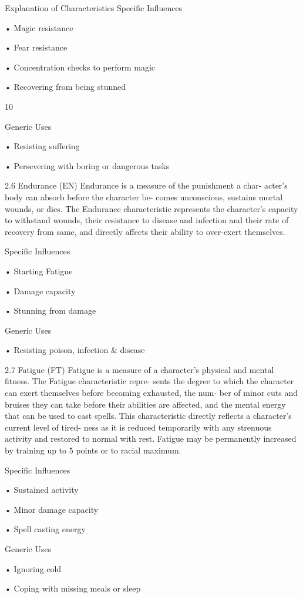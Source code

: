 \begin{Chapter}{Explanation of Characteristics}
Specific Influences  

• Magic resistance  

• Fear resistance  

• Concentration checks to perform magic  

• Recovering from being stunned 

10 

Generic Uses  

• Resisting suffering  

• Persevering with boring or dangerous tasks 

2.6 Endurance (EN) 
Endurance  is  a  measure  of  the  punishment  a char-
acter’s  body  can  absorb  before  the  character  be-
comes  unconscious,  sustains  mortal  wounds,  or 
dies.  The  Endurance  characteristic  represents  the 
character’s  capacity  to  withstand  wounds,  their 
resistance to disease and infection and their rate of 
recovery  from  same,  and  directly  affects  their 
ability to over-exert themselves. 

Specific Influences  

• Starting Fatigue  

• Damage capacity  

• Stunning from damage 

Generic Uses  

• Resisting poison, infection \& disease 

2.7 Fatigue (FT) 
Fatigue  is  a  measure  of  a  character’s  physical  and 
mental  fitness.  The  Fatigue  characteristic  repre-
sents  the  degree  to  which  the  character  can  exert 
themselves  before  becoming  exhausted,  the  num-
ber of minor cuts and bruises they can take before 
their  abilities  are  affected,  and  the  mental  energy 
that  can  be  used  to  cast  spells.  This  characteristic 
directly reflects a character’s current level of tired-
ness as it is reduced temporarily with any strenuous 
activity  and  restored  to  normal  with  rest.  Fatigue 
may  be  permanently  increased  by  training  up  to  5 
points or to racial maximum. 

Specific Influences  

• Sustained activity  

• Minor damage capacity  

• Spell casting energy 

Generic Uses  

• Ignoring cold  

• Coping with missing meals or sleep 


\end{Chapter}
